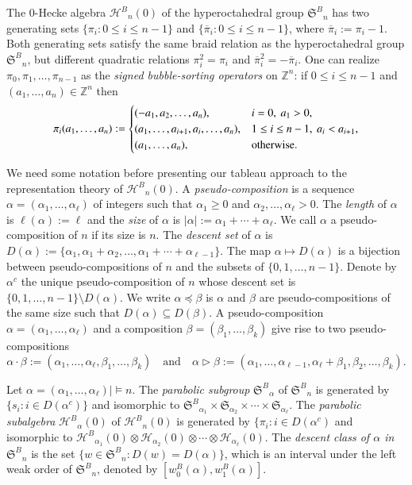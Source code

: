 \documentclass{amsart}
\newtheorem*{Young's Rule}{Young's Rule}
\theoremstyle{definition}
\theoremstyle{remark}
\numberwithin{equation}{section}
\begin{document}
The 0-Hecke algebra ${\mathcal{H}^B}_n(0)$ of the hyperoctahedral group ${{\mathfrak S}^B}_n$ has two generating sets $\{\pi_i:0\le i\le n-1\}$ and $\{{\overline{\pi}}_i:0\le i\le n-1\}$, where ${\overline{\pi}}_i := \pi_i-1$. Both generating sets satisfy the same braid relation as the hyperoctahedral group ${{\mathfrak S}^B}_n$, but different quadratic relations $\pi_i^2=\pi_i$ and ${\overline{\pi}}_i^2=-{\overline{\pi}}_i$. One can realize $\pi_0,\pi_1,\ldots,\pi_{n-1}$ as the \emph{signed bubble-sorting operators} on ${{\mathbb Z}}^n$: if $0\le i\le n-1$ and $(a_1,\ldots,a_n)\in {{\mathbb Z}}^n$ then
\[ \pi_i(a_1,\ldots,a_n):=
\begin{cases}
(-a_1,a_2,\ldots, a_n), & i=0,\ a_1>0,\\
(a_1,\ldots,a_{i+1},a_i,\ldots,a_n), & 1\leq i\leq n-1,\ a_i<a_{i+1},\\
(a_1,\ldots,a_n), & {\rm otherwise}.
\end{cases} \]

We need some notation before presenting our tableau approach to the representation theory of ${\mathcal{H}^B}_n(0)$. A \emph{pseudo-composition} is a sequence $\alpha=(\alpha_1,\ldots,\alpha_\ell)$ of integers such that $\alpha_1\geq0$ and $\alpha_2,\ldots,\alpha_\ell>0$. The \emph{length} of $\alpha$ is $\ell(\alpha):=\ell$ and the \emph{size} of $\alpha$ is $|\alpha|:=\alpha_1+\cdots+\alpha_\ell$. We call $\alpha$ a pseudo-composition of $n$ if its size is $n$. The \emph{descent set} of $\alpha$ is 
$
D(\alpha):=\{\alpha_1,\alpha_1+\alpha_2,\ldots,\alpha_1+\cdots+\alpha_{\ell-1}\}.
$
The map $\alpha\mapsto D(\alpha)$ is a bijection between pseudo-compositions of $n$ and the subsets of $\{0,1,\ldots,n-1\}$.
Denote by $\alpha^c$ the unique pseudo-composition of $n$ whose descent set is $\{0,1,\ldots,n-1\} \setminus D(\alpha)$. 
We write $\alpha{\operatorname{\preccurlyeq}}\beta$ is $\alpha$ and $\beta$ are pseudo-compositions of the same size such that $D(\alpha)\subseteq D(\beta)$.
A pseudo-composition $\alpha=(\alpha_1,\ldots,\alpha_\ell)$ and a composition $\beta=(\beta_1,\ldots,\beta_k)$ give rise to two pseudo-compositions
\[ \alpha\cdot\beta:=(\alpha_1,\ldots,\alpha_\ell,\beta_1,\ldots,\beta_k)
\quad\text{and}\quad 
\alpha\rhd\beta:=(\alpha_1,\ldots,\alpha_{\ell-1},\alpha_\ell+\beta_1,\beta_2,\ldots,\beta_k). \]

Let $\alpha=(\alpha_1,\ldots,\alpha_\ell)\mid\models n$. The \emph{parabolic subgroup} ${{\mathfrak S}^B}_\alpha$ of ${{\mathfrak S}^B}_n$ is generated by $\{s_i:i\in D(\alpha^c)\}$ and isomorphic to ${{\mathfrak S}^B}_{\alpha_1}\times{{\mathfrak S}}_{\alpha_2}\times \cdots\times{{\mathfrak S}}_{\alpha_\ell}$.  The \emph{parabolic subalgebra} ${\mathcal{H}^B}_\alpha(0)$ of ${\mathcal{H}^B}_n(0)$ is generated by $\{\pi_i: i\in D(\alpha^c)$ and isomorphic to ${\mathcal{H}^B}_{\alpha_1}(0) \otimes{\mathcal{H}}_{\alpha_2}(0)\otimes\cdots\otimes {\mathcal{H}}_{\alpha_\ell}(0)$. The \emph{descent class of $\alpha$ in ${{\mathfrak S}^B}_n$} is the set $\{w\in{{\mathfrak S}^B}_n: D(w) = D(\alpha) \}$, which is an interval under the left weak order of ${{\mathfrak S}^B}_n$, denoted by $[w^B_0(\alpha),w^B_1(\alpha)]$.
\end{document}
